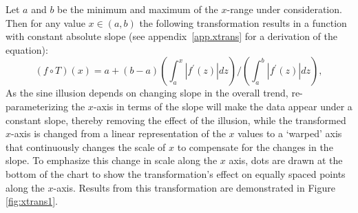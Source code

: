 \documentclass[12pt]{article}\usepackage[]{graphicx}\usepackage[]{color}
\begin{document}
Let $a$ and $b$ be the minimum and maximum of the $x$-range under consideration. Then for any value $x \in (a,b)$ the following transformation results in a function with constant absolute slope (see appendix~\ref{app.xtrans} for a derivation of the equation):
\begin{equation}\label{eqn.xtrans}
(f \circ T)(x) = a + (b-a)\left(\int_{a}^x |f^\prime(z)| dz\right)/\left(\int_{a}^{b}|f^\prime(z)| dz\right),
\end{equation}
 As the sine illusion depends on changing slope in the overall trend,  re-parameterizing the $x$-axis in terms of the slope will make the data  appear under a  constant slope, thereby removing the effect of the illusion, while the transformed $x$-axis is changed from a linear representation of the $x$ values to a `warped' axis that continuously changes the scale of $x$ to compensate for the changes in the slope.
 To emphasize this change in scale along the $x$ axis,  dots are drawn at  the bottom of the chart  to show the transformation's effect on equally spaced points along the $x$-axis. Results from this transformation are demonstrated in Figure \ref{fig:xtrans1}.
 
\end{document}
